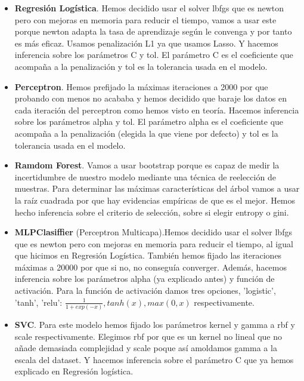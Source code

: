 \documentclass[a4paper,11pt]{article}
\begin{document}
\begin{itemize}

\item \textbf{Regresión Logística}. Hemos decidido usar el solver lbfgs que es
newton pero con mejoras en memoria para reducir el tiempo, vamos a usar este
porque newton adapta la tasa de aprendizaje según le convenga y por tanto es más
eficaz. Usamos penalización L1 ya que usamos Lasso. Y hacemos inferencia sobre
los parámetros C y tol. El parámetro C es el coeficiente que acompaña a la
penalización y tol es la tolerancia usada en el modelo.

\item \textbf{Perceptron}. Hemos prefijado la máximas iteraciones a 2000 por que
probando con menos no acababa y hemos decidido que baraje los datos en cada
iteración del perceptron como hemos visto en teoría. Hacemos inferencia sobre
los parámetros alpha y tol. El parámetro alpha es el coeficiente que acompaña a
la penalización (elegida la que viene por defecto) y tol es la tolerancia usada
en el modelo.

\item \textbf{Ramdom Forest}. Vamos a usar bootstrap porque es capaz de medir la
incertidumbre de nuestro modelo mediante una técnica de reelección de muestras.
Para determinar las máximas características del árbol vamos a usar la raíz
cuadrada por que hay evidencias empíricas de que es el mejor. Hemos hecho
inferencia sobre el criterio de selección, sobre si elegir entropy o gini. 

\item \textbf{MLPClasiffier} (Perceptron Multicapa).Hemos decidido usar el
solver lbfgs que es newton pero con mejoras en memoria para reducir el tiempo,
al igual que hicimos en Regresión Logística. También hemos fijado las
iteraciones máximas a 20000 por que si no, no conseguía converger. Además,
hacemos inferencia sobre los parámetros alpha (ya explicado antes) y función de
activación. Para la función de activación damos tres opciones, 'logistic',
'tanh', 'relu': $ \frac{1}{1 + exp(-x)} , tanh(x), max(0, x)$ respectivamente.

\item \textbf{SVC}. Para este modelo hemos fijado los parámetros kernel y gamma
a rbf y scale respectivamente. Elegimos rbf por que es un kernel no lineal que
no añade demasiada complejidad y scale poque así amoldamos gamma a la escala del dataset. Y hacemos inferencia
sobre el parámetro C que ya hemos explicado en Regresión logística.

\end{itemize}
\end{document}
